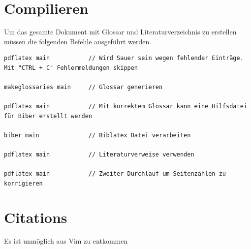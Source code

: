 \section{Compilieren}
Um das gesamte Dokument mit Glossar und Literaturverzeichnis zu erstellen müssen die folgenden Befehle ausgeführt werden.

\begin{lstlisting}[caption=Compilieren des Dokuments, label=CompileInstructions]
pdflatex main           // Wird Sauer sein wegen fehlender Einträge. Mit "CTRL + C" Fehlermeldungen skippen

makeglossaries main     // Glossar generieren

pdflatex main           // Mit korrektem Glossar kann eine Hilfsdatei für Biber erstellt werden

biber main              // Biblatex Datei verarbeiten

pdflatex main           // Literaturverweise verwenden

pdflatex main           // Zweiter Durchlauf um Seitenzahlen zu korrigieren
\end{lstlisting}

\section{Citations}
Es ist unmöglich aus Vim zu entkommen \cite{nerd_how_2012}